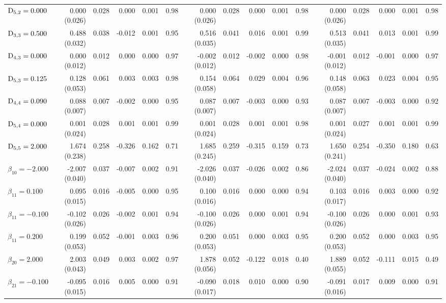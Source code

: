 \begin{landscape}
\begin{table}[ht]
\begin{tabular}{l|rrrrr:rrrrr:rrrrr}
  $\mathrm{D}_{5,2}= 0.000$ &  0.000 (0.026) & 0.028 &  0.000 & 0.001 & 0.98 &  0.000 (0.026) & 0.028 &  0.000 & 0.001 & 0.98 &  0.000 (0.026) & 0.028 &  0.000 & 0.001 & 0.98 \\ 
  $\mathrm{D}_{3,3}= 0.500$ &  0.488 (0.032) & 0.038 & -0.012 & 0.001 & 0.95 &  0.516 (0.035) & 0.041 &  0.016 & 0.001 & 0.99 &  0.513 (0.035) & 0.041 &  0.013 & 0.001 & 0.99 \\ 
  $\mathrm{D}_{4,3}= 0.000$ &  0.000 (0.012) & 0.012 &  0.000 & 0.000 & 0.97 & -0.002 (0.012) & 0.012 & -0.002 & 0.000 & 0.98 & -0.001 (0.012) & 0.012 & -0.001 & 0.000 & 0.97 \\ 
  $\mathrm{D}_{5,3}= 0.125$ &  0.128 (0.053) & 0.061 &  0.003 & 0.003 & 0.98 &  0.154 (0.058) & 0.064 &  0.029 & 0.004 & 0.96 &  0.148 (0.058) & 0.063 &  0.023 & 0.004 & 0.95 \\ 
  $\mathrm{D}_{4,4}= 0.090$ &  0.088 (0.007) & 0.007 & -0.002 & 0.000 & 0.95 &  0.087 (0.007) & 0.007 & -0.003 & 0.000 & 0.93 &  0.087 (0.007) & 0.007 & -0.003 & 0.000 & 0.92 \\ 
  $\mathrm{D}_{5,4}= 0.000$ &  0.001 (0.024) & 0.028 &  0.001 & 0.001 & 0.99 &  0.001 (0.024) & 0.028 &  0.001 & 0.001 & 0.98 &  0.001 (0.024) & 0.027 &  0.001 & 0.001 & 0.99 \\ 
  $\mathrm{D}_{5,5}= 2.000$ &  1.674 (0.238) & 0.258 & -0.326 & 0.162 & 0.71 &  1.685 (0.245) & 0.259 & -0.315 & 0.159 & 0.73 &  1.650 (0.241) & 0.254 & -0.350 & 0.180 & 0.63 \\ 
  $\beta_{10}=-2.000$ & -2.007 (0.040) & 0.037 & -0.007 & 0.002 & 0.91 & -2.026 (0.040) & 0.037 & -0.026 & 0.002 & 0.86 & -2.024 (0.040) & 0.037 & -0.024 & 0.002 & 0.88 \\ 
  $\beta_{11}= 0.100$ &  0.095 (0.015) & 0.016 & -0.005 & 0.000 & 0.95 &  0.100 (0.016) & 0.016 &  0.000 & 0.000 & 0.94 &  0.103 (0.017) & 0.016 &  0.003 & 0.000 & 0.92 \\ 
  $\beta_{11}=-0.100$ & -0.102 (0.026) & 0.026 & -0.002 & 0.001 & 0.94 & -0.100 (0.026) & 0.026 &  0.000 & 0.001 & 0.94 & -0.100 (0.026) & 0.026 &  0.000 & 0.001 & 0.93 \\ 
  $\beta_{11}= 0.200$ &  0.199 (0.053) & 0.052 & -0.001 & 0.003 & 0.96 &  0.200 (0.053) & 0.051 &  0.000 & 0.003 & 0.95 &  0.200 (0.053) & 0.052 &  0.000 & 0.003 & 0.95 \\ 
  $\beta_{20}= 2.000$ &  2.003 (0.043) & 0.049 &  0.003 & 0.002 & 0.97 &  1.878 (0.056) & 0.052 & -0.122 & 0.018 & 0.40 &  1.889 (0.055) & 0.052 & -0.111 & 0.015 & 0.49 \\ 
  $\beta_{21}=-0.100$ & -0.095 (0.015) & 0.016 &  0.005 & 0.000 & 0.91 & -0.090 (0.017) & 0.018 &  0.010 & 0.000 & 0.90 & -0.091 (0.016) & 0.017 &  0.009 & 0.000 & 0.91 \\ 

\end{tabular}
\end{table}
\end{landscape}
